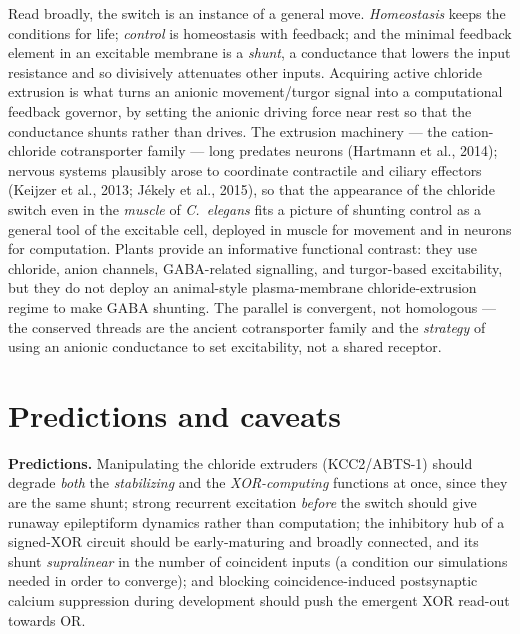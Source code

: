 \documentclass[11pt,a4paper]{article}
\begin{document}
Read broadly, the switch is an instance of a general move. \emph{Homeostasis} keeps the conditions for life; \emph{control} is homeostasis with feedback; and the minimal feedback element in an excitable membrane is a \emph{shunt}, a conductance that lowers the input resistance and so divisively attenuates other inputs. Acquiring active chloride extrusion is what turns an anionic movement/turgor signal into a computational feedback governor, by setting the anionic driving force near rest so that the conductance shunts rather than drives. The extrusion machinery --- the cation-chloride cotransporter family --- long predates neurons (Hartmann et al., 2014); nervous systems plausibly arose to coordinate contractile and ciliary effectors (Keijzer et al., 2013; J\'ekely et al., 2015), so that the appearance of the chloride switch even in the \emph{muscle} of \emph{C.~elegans} fits a picture of shunting control as a general tool of the excitable cell, deployed in muscle for movement and in neurons for computation. Plants provide an informative functional contrast: they use chloride, anion channels, GABA-related signalling, and turgor-based excitability, but they do not deploy an animal-style plasma-membrane chloride-extrusion regime to make GABA shunting. The parallel is convergent, not homologous --- the conserved threads are the ancient cotransporter family and the \emph{strategy} of using an anionic conductance to set excitability, not a shared receptor.

\section{Predictions and caveats}\label{sec:pred}
\textbf{Predictions.} Manipulating the chloride extruders (KCC2/ABTS-1) should degrade \emph{both} the \emph{stabilizing} and the \emph{XOR-computing} functions at once, since they are the same shunt; strong recurrent excitation \emph{before} the switch should give runaway epileptiform dynamics rather than computation; the inhibitory hub of a signed-XOR circuit should be early-maturing and broadly connected, and its shunt \emph{supralinear} in the number of coincident inputs (a condition our simulations needed in order to converge); and blocking coincidence-induced postsynaptic calcium suppression during development should push the emergent XOR read-out towards OR.
\end{document}
